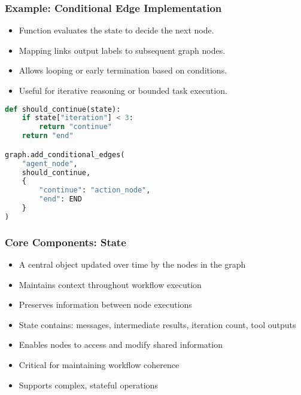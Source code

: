 \begin{frame}[fragile]\frametitle{Example: Conditional Edge Implementation}
\begin{itemize}
  \item Function evaluates the state to decide the next node.
  \item Mapping links output labels to subsequent graph nodes.
  \item Allows looping or early termination based on conditions.
  \item Useful for iterative reasoning or bounded task execution.
\end{itemize}

\begin{lstlisting}[language=Python]
def should_continue(state):
    if state["iteration"] < 3:
        return "continue"
    return "end"

graph.add_conditional_edges(
    "agent_node",
    should_continue,
    {
        "continue": "action_node",
        "end": END
    }
)
\end{lstlisting}


\end{frame}

\begin{frame}[fragile]\frametitle{Core Components: State}
      \begin{itemize}
	    \item A central object updated over time by the nodes in the graph
        \item Maintains context throughout workflow execution
        \item Preserves information between node executions
        \item State contains: messages, intermediate results, iteration count, tool outputs
        \item Enables nodes to access and modify shared information
        \item Critical for maintaining workflow coherence
        \item Supports complex, stateful operations
      \end{itemize}
\end{frame}

